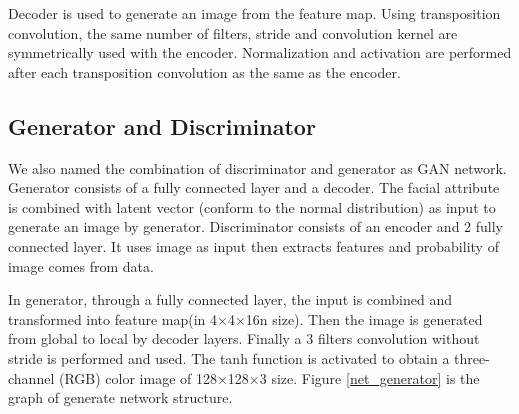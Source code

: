 Decoder is used to generate an image from the feature map.
Using transposition convolution, the same number of filters,
    stride and convolution kernel are symmetrically used with the encoder.
Normalization and activation are performed after each transposition convolution as the same as the encoder.

\subsection{Generator and Discriminator}

We also named the combination of discriminator and generator as GAN network.
Generator consists of a fully connected layer and a decoder.
The facial attribute is combined with latent vector (conform to the normal distribution) as input to generate an image by generator.
Discriminator consists of an encoder and 2 fully connected layer.
It uses image as input then extracts features and probability of image comes from data.


In generator, through a fully connected layer, the input is combined and transformed into feature map(in 4×4×16n size).
Then the image is generated from global to local by decoder layers.
Finally a 3 filters convolution without stride is performed and used.
The tanh function is activated to obtain a three-channel (RGB) color image of 128×128×3 size.
Figure \ref{net_generator} is the graph of generate network structure.

